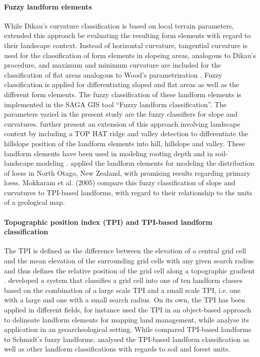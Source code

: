 \documentclass[preprint,12pt,authoryear]{elsarticle}
\begin{document}
\paragraph{Fuzzy landform elements \citep{Schmidt2004}}
While Dikau's curvature classification is based on local terrain parameters, \cite{Schmidt2004} extended this approach be evaluating the resulting form elements with regard to their landscape context.  Instead of horizontal curvature, tangential curvature is used for the classification of form elements in slopeing areas, analogous to Dikau's procedure, and maximum and minimum curvature are included for the classification of flat areas analogous to Wood's parametrization \citep{Wood1996}. Fuzzy classification is applied for differentiating sloped and flat areas as well as the different form elements. The fuzzy classification of these landform elements is implemented in the SAGA GIS tool “Fuzzy landform classification”. The parameters varied in the present study are the fuzzy classifiers for slope and curvatures. \cite{Schmidt2004} further present an extension of this approach involving landscape context by including a TOP HAT ridge and valley detection \citep{Rodriguez2002}  to differentiate the hillslope position of the landform elements into hill, hillslope and valley. These landform elements have been used in modeling rooting depth \citep{Schmidt2004} and in  soil-landscape modeling \citep{Schmidt2005}. \cite{Hughes2009} applied  the landform elements for modeling the distribution of loess in North Otago, New Zealand, with promising results regarding primary loess. Mokkaram et al. (2005) compare this fuzzy classification of slope and curvatures to TPI-based landforms, with regard to their relationship to the units of a geological map.
\paragraph{Topographic position index (TPI) and TPI-based landform classification \citep{Weiss2000}}
The TPI is defined as the difference between the elevation of a central grid cell and the mean elevation of the surrounding grid cells with any given search radius and thus defines the relative position of the grid cell along a topographic gradient \citep{Guisan1999}. \cite{Weiss2000} developed a system that classifies a grid cell into one of ten landform classes based on the combination of a large scale TPI and a small scale TPI, i.e. one with a large and one with a small search radius.  On its own, the TPI has been applied in different fields, for instance \cite{Gercek2010} used the TPI in an object-based approach to delineate landform elements for mapping land management, while \cite{Reu2013} analyse its application in an geoarcheological setting. While \cite{Mokarram2015} compared TPI-based landforms to Schmidt's fuzzy landforms, \cite{Barka2011} analysed the TPI-based landform classification as well as other landform classifications with regards to  soil and forest units.
\end{document}

